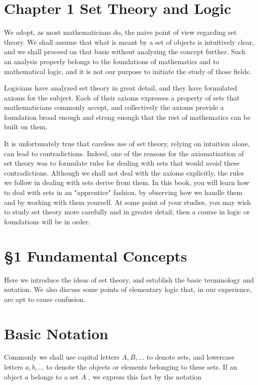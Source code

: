 \documentclass[10pt]{article}
\begin{document}
\section*{Chapter 1 Set Theory and Logic}

We adopt, as most mathematicians do, the naive point of view regarding set theory. We shall assume that what is meant by a set of objects is intuitively clear, and we shall proceed on that basis without analyzing the concept further. Such an analysis properly belongs to the foundations of mathematics and to mathematical logic, and it is not our purpose to initiate the study of those fields.

Logicians have analyzed set theory in great detail, and they have formulated axioms for the subject. Each of their axioms expresses a property of sets that mathematicians commonly accept, and collectively the axioms provide a foundation broad enough and strong enough that the rest of mathematics can be built on them.

It is unfortunately true that careless use of set theory, relying on intuition alone, can lead to contradictions. Indeed, one of the reasons for the axiomatization of set theory was to formulate rules for dealing with sets that would avoid these contradictions. Although we shall not deal with the axioms explicitly, the rules we follow in dealing with sets derive from them. In this book, you will learn how to deal with sets in an "apprentice" fashion, by observing how we handle them and by working with them yourself. At some point of your studies, you may wish to study set theory more carefully and in greater detail; then a course in logic or foundations will be in order.

\section*{§1 Fundamental Concepts}

Here we introduce the ideas of set theory, and establish the basic terminology and notation. We also discuss some points of elementary logic that, in our experience, are apt to cause confusion.

\section*{Basic Notation}

Commonly we shall use capital letters \(A,B,\ldots\) to denote sets, and lowercase letters \(a,b,\ldots\) to denote the objects or elements belonging to these sets. If an object \(a\) belongs to a set \(A\) , we express this fact by the notation
\end{document}
